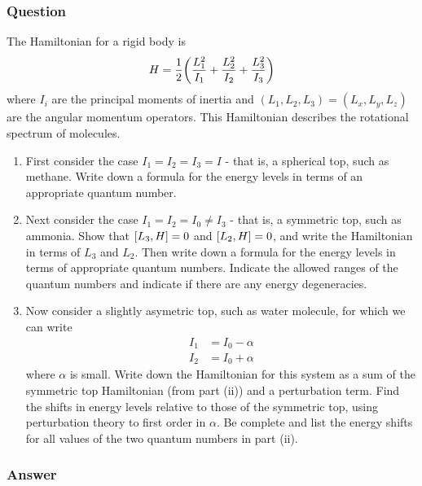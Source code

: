 \subsubsection{Question}
The Hamiltonian for a rigid body is
\begin{equation*}
	H = \frac{1}{2}\qty(\frac{L_1^2}{I_1}+\frac{L_2^2}{I_2}+\frac{L_3^2}{I_3})
\end{equation*}
where $I_i$ are the principal moments of inertia and $(L_1, L_2, L_3) = (L_x, L_y, L_z)$ are the angular momentum operators. This Hamiltonian describes the rotational spectrum of molecules.
\begin{enumerate}
	\item First consider the case $I_1 = I_2 = I_3 = I$ - that is, a spherical top, such as methane. Write down a formula for the energy levels in terms of an appropriate quantum number.
	\item Next consider the case $I_1 = I_2 = I_0\ne I_3$ - that is, a symmetric top, such as ammonia. Show that $\comm{L_3}{H} = 0$ and $\comm{L_2}{H} = 0$, and write the Hamiltonian in terms of $L_3$ and $L_2$. Then write down a formula for the energy levels in terms of appropriate quantum numbers. Indicate the allowed ranges of the quantum numbers and indicate if there are any energy degeneracies.
	\item Now consider a slightly asymetric top, such as water molecule, for which we can write
	\begin{align*}
		I_1 &= I_0 -\alpha\\
		I_2 &= I_0 +\alpha
	\end{align*}
	where $\alpha$ is small. Write down the Hamiltonian for this system as a sum of the symmetric top Hamiltonian (from part (ii)) and a perturbation term. Find the shifts in energy levels relative to those of the symmetric top, using perturbation theory to first order in $\alpha$. Be complete and list the energy shifts for all values of the two quantum numbers in part (ii).
\end{enumerate}
\subsubsection{Answer}



